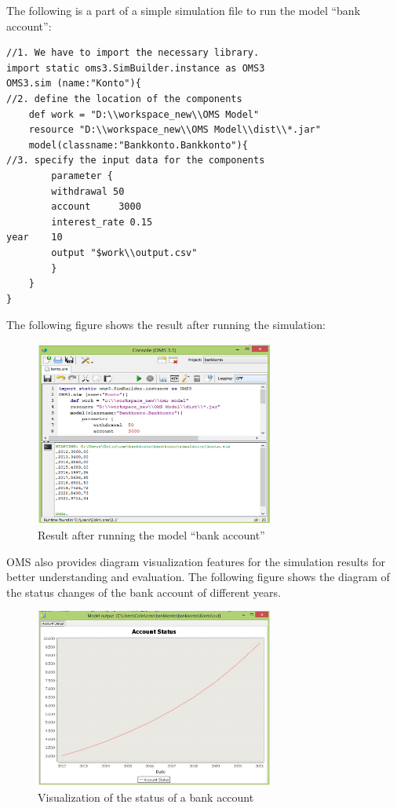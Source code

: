 \par
The following is a part of a simple simulation file to run the model “bank account”:
\begin{verbatim}
//1. We have to import the necessary library.
import static oms3.SimBuilder.instance as OMS3
OMS3.sim (name:"Konto"){
//2. define the location of the components
	def work = "D:\\workspace_new\\OMS Model"
	resource "D:\\workspace_new\\OMS Model\\dist\\*.jar"
	model(classname:"Bankkonto.Bankkonto"){
//3. specify the input data for the components
		parameter {
		withdrawal 50
		account 	3000
		interest_rate 0.15
year 	10
		output "$work\\output.csv"
		}
	}
}
\end{verbatim}
\par
The following figure shows the result after running the simulation:
\begin{figure}[h]
	\centering
	\includegraphics[width=0.7\textwidth]{pics/oms/Figure9.png}
	\caption{Result after running the model “bank account”
 \label{fig:Result_Bank_Account}}	
\end{figure}
\par
OMS also provides diagram visualization features for the simulation results for better understanding and evaluation. The following figure shows the diagram of the status changes of the bank account of different years.
\begin{figure}[h]
	\centering
	\includegraphics[width=0.7\textwidth]{pics/oms/Figure10.png}
	\caption{Visualization of the status of a bank account
 \label{fig:Visualization_Bank_Account}}	
\end{figure}
